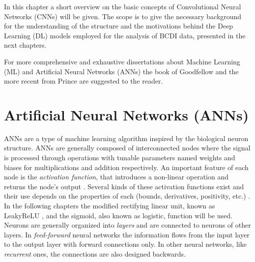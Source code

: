 

In this chapter a short overview on the basic concepts of Convolutional Neural Networks (CNNs) will be given. 
The scope is to give the necessary background for the understanding of the structure and the motivations behind the 
Deep Learning (DL) models employed for the analysis of BCDI data, presented in the next chapters.  

For more comprehensive and exhaustive dissertations about Machine Learning (ML) and Artificial Neural Networks (ANNs)
the book of Goodfellow \cite{Goodfellow_2016} and the more recent from Prince \cite{prince2023understanding} are 
suggested to the reader. 

\section{Artificial Neural Networks (ANNs)}

ANNs are a type of machine learning algorithm inspired by the biological neuron structure. ANNs are generally composed of interconnected 
nodes where the signal is processed through operations with tunable parameters named weights 
and biases for multiplications and addition respectively. An important feature of each node is the \textit{activation function}, 
that introduces a non-linear operation and returns the node's output \cite{jagtap2022}. Several kinds of these 
activation functions exist and their use depends on the properties of each (bounds, derivatives, positivity, etc.) 
\cite{kunc2024}. In the following chapters the modified rectifying linear unit, known as LeakyReLU \cite{Maas2013RectifierNI}, 
and the sigmoid, also known as logistic, function will be used. Neurons are generally organized into \textit{layers} and 
are connected to neurons of other layers. In \textit{feed-forward} neural networks the information flows from the 
input layer to the output layer with forward connections only.
In other neural networks, like \textit{recurrent} ones, the connections are also designed backwards. 

